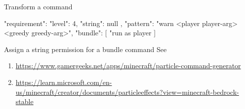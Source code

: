\begin{example}{Transform a command}
    \begin{json}
    {
        "requirement": {
        "level": 4,
        "string": null
    },
        "pattern": "warn <player player-arg> <greedy greedy-arg>",
        "bundle": [
        "run as player %
        ]
    }
    \end{json}
\end{example}

\begin{tips}{Assign a string permission for a bundle command}
    See~
\end{tips}


\begin{enumerate}
    \item \url{https://www.gamergeeks.net/apps/minecraft/particle-command-generator}
    \item \url{https://learn.microsoft.com/en-us/minecraft/creator/documents/particleeffects?view=minecraft-bedrock-stable}
\end{enumerate}
